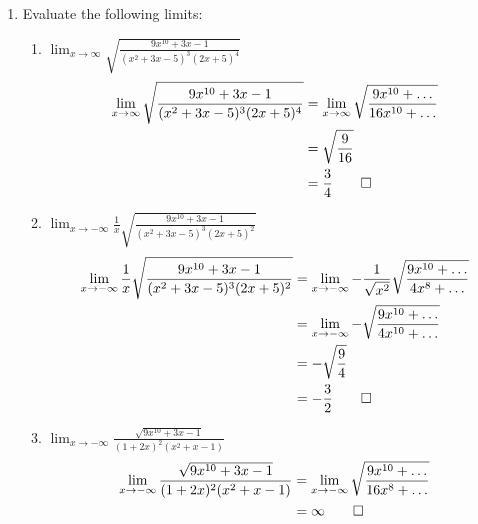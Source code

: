 \documentclass[12pt, a4paper]{article}
\begin{document}
\begin{enumerate}[Q\arabic*.]
  \item Evaluate the following limits:
    \begin{enumerate}[(\alph*)]
      \item $\displaystyle \lim_{x\to\infty}\sqrt{\frac{9x^{10}+3x-1}{(x^2+3x-5)^3(2x+5)^4}}$
        \begin{align*}
        \lim_{x\to\infty}\sqrt{\frac{9x^{10}+3x-1}{(x^2+3x-5)^3(2x+5)^4}} &= \lim_{x\to\infty}\sqrt{\frac{9x^{10}+\ldots}{16x^{10}+\ldots}}\\
                                                                          &= \sqrt{\frac{9}{16}} \\
                                                                          &= \frac{3}{4} \qed
        \end{align*}
      \item $\displaystyle \lim_{x\to-\infty}\frac{1}{x}\sqrt{\frac{9x^{10}+3x-1}{(x^2+3x-5)^3(2x+5)^2}}$
        \begin{align*}
          \lim_{x\to-\infty}\frac{1}{x}\sqrt{\frac{9x^{10}+3x-1}{(x^2+3x-5)^3(2x+5)^2}} 
                      &= \lim_{x\to-\infty}-\frac{1}{\sqrt{x^2}}\sqrt{\frac{9x^{10}+\ldots}{4x^8+\ldots}} \\
                                                                                        &= \lim_{x\to-\infty}-\sqrt{\frac{9x^{10}+\ldots}{4x^{10}+\ldots}} \\
                                                                 &= -\sqrt{\frac{9}{4}} \\
                                                                 &= -\frac{3}{2} \qed
        \end{align*}
      \item $\displaystyle \lim_{x\to-\infty}\frac{\sqrt{9x^{10}+3x-1}}{(1+2x)^2(x^2+x-1)}$
        \begin{align*}
        \lim_{x\to-\infty}\frac{\sqrt{9x^{10}+3x-1}}{(1+2x)^2(x^2+x-1)} &= \lim_{x\to-\infty}\sqrt{\frac{9x^{10}+\ldots}{16x^8+\ldots}} \\
                                                                          &= \infty \qed
        \end{align*}
    \end{enumerate}
\end{enumerate}
\end{document}

